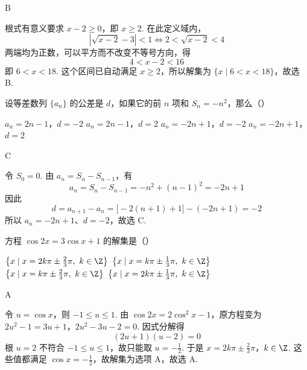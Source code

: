 \documentclass[UTF8,a4paper,oneside,11pt]{ctexbook}
\begin{document}
\begin{answer}
B
\end{answer}

\begin{solution}
根式有意义要求 \(x-2\geqslant0\)，即 \(x\geqslant2\). 在此定义域内，
\[
\left|\sqrt{x-2}-3\right|<1
\Longleftrightarrow 2<\sqrt{x-2}<4
\]
两端均为正数，可以平方而不改变不等号方向，得
\[
4<x-2<16
\]
即 \(6<x<18\). 这个区间已自动满足 \(x\geqslant2\)，所以解集为 \(\{x\mid6<x<18\}\)，故选 B.
\end{solution}

\begin{problem}
设等差数列 \(\{a_n\}\) 的公差是 \(d\)，如果它的前 \(n\) 项和 \(S_n=-n^2\)，那么（\quad）

\choices
    {\(a_n=2n-1\)，\(d=-2\)}
    {\(a_n=2n-1\)，\(d=2\)}
    {\(a_n=-2n+1\)，\(d=-2\)}
    {\(a_n=-2n+1\)，\(d=2\)}
\end{problem}

\begin{answer}
C
\end{answer}

\begin{solution}
令 \(S_0=0\). 由 \(a_n=S_n-S_{n-1}\)，有
\[
a_n=S_n-S_{n-1}=-n^2+(n-1)^2=-2n+1
\]
因此
\[
d=a_{n+1}-a_n=\bigl[-2(n+1)+1\bigr]-(-2n+1)=-2
\]
所以 \(a_n=-2n+1\)、\(d=-2\)，故选 C.
\end{solution}

\begin{problem}
方程 \(\cos 2x=3\cos x+1\) 的解集是（\quad）

\choices
    {\(\left\{x\mid x=2k\pi\pm\frac{2}{3}\pi,\ k\in\Z\right\}\)}
    {\(\left\{x\mid x=k\pi\pm\frac{1}{3}\pi,\ k\in\Z\right\}\)}
    {\(\left\{x\mid x=k\pi\pm\frac{2}{3}\pi,\ k\in\Z\right\}\)}
    {\(\left\{x\mid x=2k\pi\pm\frac{1}{3}\pi,\ k\in\Z\right\}\)}
\end{problem}

\begin{answer}
A
\end{answer}

\begin{solution}
令 \(u=\cos x\)，则 \(-1\leqslant u\leqslant1\). 由 \(\cos 2x=2\cos^2x-1\)，原方程变为
\(2u^2-1=3u+1\)，\(2u^2-3u-2=0\).
因式分解得
\[
(2u+1)(u-2)=0
\]
根 \(u=2\) 不符合 \(-1\leqslant u\leqslant1\)，故只能取 \(u=-\frac12\). 于是
\(x=2k\pi\pm\frac{2}{3}\pi\)，\(k\in\Z\).
这些值都满足 \(\cos x=-\frac12\)，故解集为选项 A，故选 A.
\end{solution}
\end{document}
